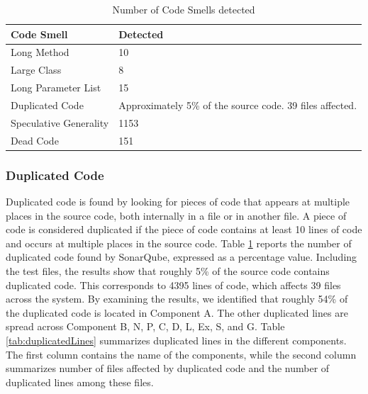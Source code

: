\begin{table}[]
\centering
\caption{Number of Code Smells detected}
\label{tab:identifiedCodeSmell}
\begin{tabular}{|l|p{3cm}|}
\hline
\textbf{Code Smell}                           & \textbf{Detected}    \\ \hline
Long Method                                   & 10          \\ \hline
Large Class                                   & 8          \\ \hline
Long Parameter List                           & 15          \\ \hline
Duplicated Code                               & Approximately 5\% of the source code. 39 files affected.       \\ \hline
Speculative Generality                        & 1153      \\ \hline
Dead Code 									  & 151 \\ \hline
\end{tabular}
\end{table}

\subsubsection{Duplicated Code}
Duplicated code is found by looking for pieces of code that appears at multiple places in the source code, both internally in a file or in another file. A piece of code is considered duplicated if the piece of code contains at least 10 lines of code and occurs at multiple places in the source code. Table \ref{tab:identifiedCodeSmell} reports the number of duplicated code found by SonarQube, expressed as a percentage value. Including the test files, the results show that roughly 5\% of the source code contains duplicated code. This corresponds to 4395 lines of code, which affects 39 files across the system. By examining the results, we identified that roughly 54\% of the duplicated code is located in Component A. The other duplicated lines are spread across Component B, N, P, C, D, L, Ex, S, and G. Table \ref{tab:duplicatedLines} summarizes duplicated lines in the different components. The first column contains the name of the components, while the second column summarizes number of files affected by duplicated code and the number of duplicated lines among these files.

